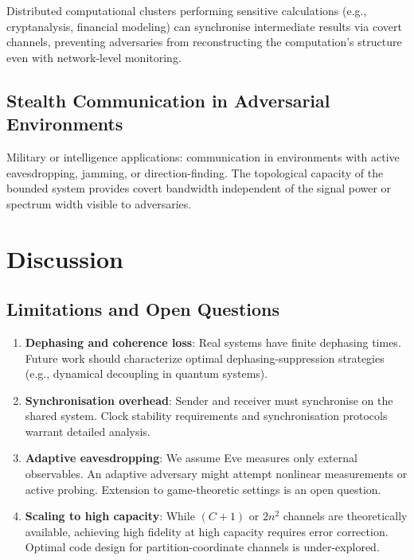 \documentclass[11pt,twocolumn,a4paper]{article}
\theoremstyle{definition}
\begin{document}
Distributed computational clusters performing sensitive calculations (e.g., cryptanalysis, financial modeling) can synchronise intermediate results via covert channels, preventing adversaries from reconstructing the computation's structure even with network-level monitoring.

\subsection{Stealth Communication in Adversarial Environments}

Military or intelligence applications: communication in environments with active eavesdropping, jamming, or direction-finding. The topological capacity of the bounded system provides covert bandwidth independent of the signal power or spectrum width visible to adversaries.

\section{Discussion}
\label{sec:discussion}

\subsection{Limitations and Open Questions}

\begin{enumerate}[nosep]
\item \textbf{Dephasing and coherence loss}: Real systems have finite dephasing times. Future work should characterize optimal dephasing-suppression strategies (e.g., dynamical decoupling in quantum systems).

\item \textbf{Synchronisation overhead}: Sender and receiver must synchronise on the shared system. Clock stability requirements and synchronisation protocols warrant detailed analysis.

\item \textbf{Adaptive eavesdropping}: We assume Eve measures only external observables. An adaptive adversary might attempt nonlinear measurements or active probing. Extension to game-theoretic settings is an open question.

\item \textbf{Scaling to high capacity}: While $(C+1)$ or $2n^2$ channels are theoretically available, achieving high fidelity at high capacity requires error correction. Optimal code design for partition-coordinate channels is under-explored.
\end{enumerate}
\end{document}
